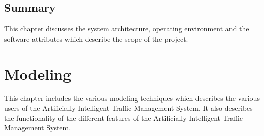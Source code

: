 \documentclass[openany,12pt]{report}
\begin{document}
	
	\section{Summary}
	\hspace*{0.5in} This chapter discusses the system architecture, operating environment and the software attributes which describe the scope of the project.
	
	\chapter{Modeling}
	
	\hspace*{0.5in} This chapter includes the various modeling techniques which describes the various users of the Artificially Intelligent Traffic Management System. It also describes the functionality of the different features of the Artificially Intelligent Traffic Management System.
	
\end{document}
